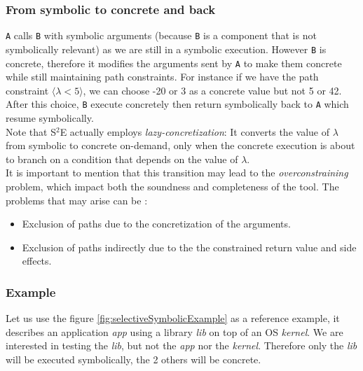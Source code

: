 \documentclass[11pt]{IEEEtran}
\begin{document}
    		\subsubsection*{From symbolic to concrete and back}
    			\texttt{A} calls \texttt{B} with symbolic arguments (because \texttt{B} is a component that is not symbolically relevant) as we are still in a symbolic execution. However \texttt{B} is concrete, therefore it modifies the arguments sent by \texttt{A} to make them concrete while still maintaining path constraints. For instance if we have the path constraint  $\langle \lambda < 5 \rangle$, we can choose -20 or 3 as a concrete value but not 5 or 42.\\
    			After this choice, \texttt{B} execute concretely then return symbolically back to \texttt{A} which resume symbolically.\\
    			Note that S$^2$E actually employs \emph{lazy-concretization}: It converts the value of $\lambda$ from symbolic to concrete on-demand, only when the concrete execution is about to branch on a condition that depends on the value of $\lambda$. \\

    			It is important to mention that this transition may lead to the \emph{overconstraining} problem, which impact both the soundness and completeness of the tool. The problems that may arise can be :
    			\begin{itemize}
    				\item Exclusion of paths due to the concretization of the arguments.
    				\item Exclusion of paths indirectly due to the the constrained return value
and side effects.
    			\end{itemize}

    	\subsubsection{Example}
    	\label{subsec:S2EExample}
    		Let us use the figure \ref{fig:selectiveSymbolicExample} as a reference example, it describes an application \emph{app} using a library \emph{lib} on top of an OS \emph{kernel}. We are interested in testing the \emph{lib}, but not the \emph{app} nor the \emph{kernel}. Therefore only the \emph{lib} will be executed symbolically, the 2 others will be concrete.\\
\end{document}
